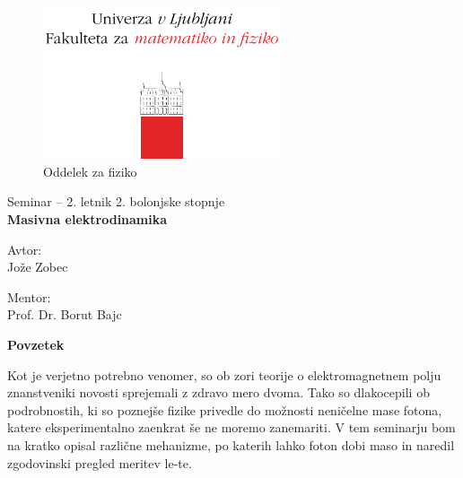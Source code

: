 \documentclass[a4paper, twocolumn, titlepage]{article}
\renewenvironment{abstract}[1][1.0]
{
	\begin{center}\large
		{\bf Povzetek}\\[12pt]
		\begin{minipage}{#1\textwidth}
}
{
		\end{minipage}
	\end{center}
}
\begin{document}
\begin{titlepage}
	\begin{figure}[H]
		\centering
		\includegraphics[width = 7cm, keepaspectratio=1]{pics/logo-slo.pdf}\\[12pt]
		\large{\sc Oddelek za fiziko}\\[4cm]
	\end{figure}
	\begin{center}
		\Large{Seminar -- 2. letnik 2. bolonjske stopnje}\\[0.5cm]
		\huge\textbf{Masivna elektrodinamika}\\[1.0cm]

		\vspace{0.0cm}

		\begin{minipage}{0.4\textwidth}\small
			\begin{flushleft}
				\large{\sc Avtor:}\\[0.2cm]
				\large{Jože Zobec}
			\end{flushleft}
		\end{minipage}
		\begin{minipage}{0.4\textwidth}\small
			\begin{flushright}
				\large{\sc Mentor:}\\[0.2cm]
				\large{Prof. Dr. Borut Bajc}
			\end{flushright}
		\end{minipage}
	\end{center}

	\vspace{4.5cm}

	\begin{abstract}
		Kot je verjetno potrebno venomer, so ob zori teorije o elektromagnetnem polju znanstveniki novosti
		sprejemali z zdravo mero dvoma. Tako so dlakocepili ob podrobnostih, ki so poznejše fizike privedle
		do možnosti neničelne mase fotona, katere eksperimentalno zaenkrat še ne moremo zanemariti. V tem
		seminarju bom na kratko opisal različne mehanizme, po katerih lahko foton dobi maso in naredil
		zgodovinski pregled meritev le-te.
	\end{abstract}
	
	\vfill

\end{titlepage}
\end{document}

